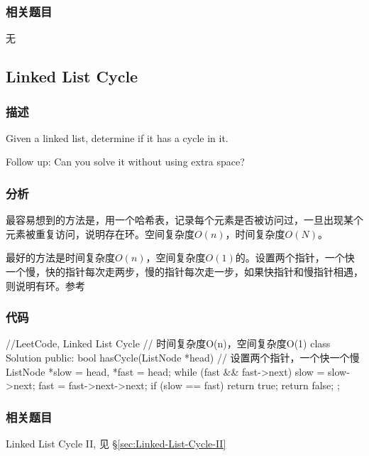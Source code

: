 \subsubsection{相关题目}
\begindot
\item 无
\myenddot


\subsection{Linked List Cycle}
\label{sec:linked-list-cycle}


\subsubsection{描述}
Given a linked list, determine if it has a cycle in it.

Follow up:
Can you solve it without using extra space?


\subsubsection{分析}
最容易想到的方法是，用一个哈希表，记录每个元素是否被访问过，一旦出现某个元素被重复访问，说明存在环。空间复杂度$O(n)$，时间复杂度$O(N)$。

最好的方法是时间复杂度$O(n)$，空间复杂度$O(1)$的。设置两个指针，一个快一个慢，快的指针每次走两步，慢的指针每次走一步，如果快指针和慢指针相遇，则说明有环。参考


\subsubsection{代码}
\begin{Code}
//LeetCode, Linked List Cycle
// 时间复杂度O(n)，空间复杂度O(1)
class Solution {
public:
    bool hasCycle(ListNode *head) {
        // 设置两个指针，一个快一个慢
        ListNode *slow = head, *fast = head;
        while (fast && fast->next) {
            slow = slow->next;
            fast = fast->next->next;
            if (slow == fast) return true;
        }
        return false;
    }
};
\end{Code}


\subsubsection{相关题目}
\begindot
\item Linked List Cycle II, 见 \S \ref{sec:Linked-List-Cycle-II}
\myenddot


